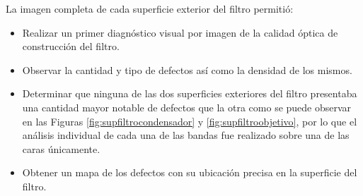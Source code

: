 \documentclass{ctuthesis}
\begin{document}
\begin{figure}[H]
	\begin{floatrow}
	\end{floatrow}
	
\end{figure}

La imagen completa de cada superficie exterior del filtro permitió:
\begin{itemize}
	\item Realizar un primer diagnóstico visual por imagen de la calidad óptica de construcción del filtro. 
	\item Observar la cantidad y tipo de defectos así como la densidad de los mismos.
	\item Determinar que ninguna de las dos superficies exteriores del filtro presentaba una cantidad mayor notable de defectos que la otra como se puede observar en las Figuras \ref{fig:supfiltrocondensador} y \ref{fig:supfiltroobjetivo}, por lo que el análisis individual de cada una de las bandas fue realizado sobre una de las caras únicamente.
	\item Obtener un mapa de los defectos con su ubicación precisa en la superficie del filtro.
\end{itemize}
\end{document}
